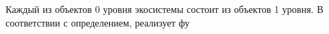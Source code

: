 Каждый из объектов 0 уровня экосистемы состоит из объектов 1 уровня.
В соответствии с определением, реализует фу
